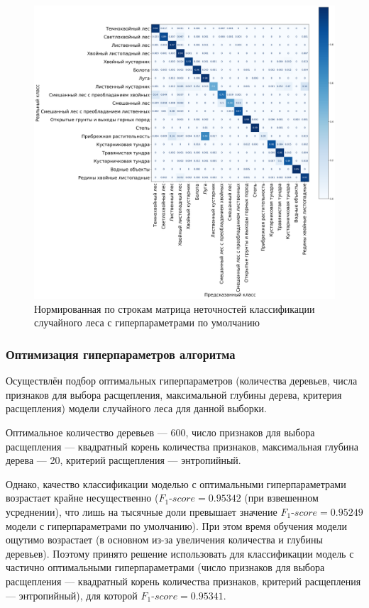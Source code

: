 \documentclass[14pt, a4paper, oneside]{extarticle}
\begin{document}
\begin{figure}[H]
    \caption{Нормированная по строкам матрица неточностей классификации случайного леса с гиперпараметрами по умолчанию}
    \centering
    \includegraphics[scale=0.33]{confusion-matrix-2}
\end{figure}

\subsubsection{Оптимизация гиперпараметров алгоритма}
Осуществлён подбор оптимальных гиперпараметров (количества деревьев, числа признаков для выбора расщепления, максимальной глубины дерева, критерия расщепления) модели случайного леса для данной выборки.

Оптимальное количество деревьев --- 600, число признаков для выбора расщепления --- квадратный корень количества признаков, максимальная глубина дерева --- 20, критерий расщепления --- энтропийный.

Однако, качество классификации моделью с оптимальными гиперпараметрами возрастает крайне несущественно ($F_1\mbox{-}score = 0.95342$ (при взвешенном усреднении), что лишь на тысячные доли превышает значение $F_1\mbox{-}score = 0.95249$ модели с гиперпараметрами по умолчанию). При этом время обучения модели ощутимо возрастает (в основном из-за увеличения количества и глубины деревьев). Поэтому принято решение использовать для классификации модель с частично оптимальными гиперпараметрами (число признаков для выбора расщепления --- квадратный корень количества признаков, критерий расщепления --- энтропийный), для которой $F_1\mbox{-}score = 0.95341$.
\end{document}
